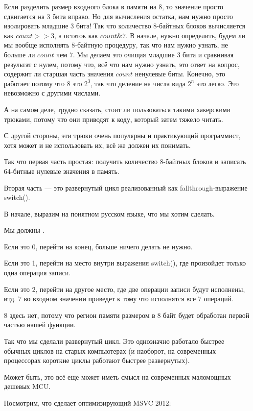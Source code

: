 Если разделить размер входного блока в памяти на 8, то значение просто сдвигается на 3 бита вправо.
Но для вычисления остатка, нам нужно просто изолировать младшие 3 бита!
Так что количество 8-байтных блоков вычисляется как $count>>3$, а остаток как $count \& 7$.
В начале, нужно определить, будем ли мы вообще исполнять 8-байтную процедуру,
так что нам нужно узнать, не больше ли $count$ чем 7.
Мы делаем это очищая младшие 3 бита и сравнивая результат с нулем, потому что,
всё что нам нужно узнать, это ответ на вопрос, содержит ли старшая часть значения $count$ ненулевые биты.
Конечно, это работает потому что 8 это $2^{3}$, так что деление на числа вида $2^n$ это легко.
Это невозможно с другими числами.

А на самом деле, трудно сказать, стоит ли пользоваться такими хакерскими трюками, потому что они
приводят к коду, который затем тяжело читать.

С другой стороны, эти трюки очень популярны и практикующий программист, хотя может и не использовать
их, всё же должен их понимать.

Так что первая часть простая: получить количество 8-байтных блоков и записать 64-битные нулевые значения
в память.

Вторая часть --- это развернутый цикл реализованный как fallthrough-выражение switch().

В начале, выразим на понятном русском языке, что мы хотим сделать.

Мы должны .

Если это 0, перейти на конец, больше ничего делать не нужно.

Если это 1, перейти на место внутри выражения switch(), где произойдет только одна операция записи.

Если это 2, перейти на другое место, где две операции записи будут исполнены, итд.
7 во входном значении приведет к тому что исполнятся все 7 операций.

8 здесь нет, потому что регион памяти размером в 8 байт будет обработан первой частью нашей функции.

Так что мы сделали развернутый цикл.
Это однозначно работало быстрее обычных циклов на старых компьютерах
(и наоборот, на современных процессорах короткие циклы работают быстрее развернутых).

Может быть, это всё еще может иметь смысл на современных маломощных дешевых \ac{MCU}.

Посмотрим, что сделает оптимизирующий MSVC 2012:

